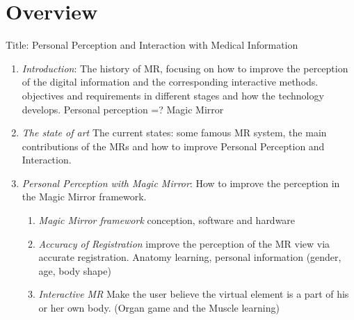 %
\section*{Overview}
\label{sec:methods}

Title: Personal Perception and Interaction with Medical Information

\begin{enumerate}
	\item
		\emph{Introduction}: The history of MR, focusing on how to improve the perception of the digital information and the corresponding interactive methods. objectives and requirements in different stages and how the technology develops.
		Personal perception =? Magic Mirror
	\item	
		\emph{The state of art} The current states: some famous MR system, the main contributions of the MRs and how to improve Personal Perception and Interaction. 
	
	\item
		\emph{Personal Perception with Magic Mirror}: How to improve the perception in the Magic Mirror framework.
		\begin{enumerate}
		\item	\emph{Magic Mirror framework} conception, software and hardware
		\item	\emph{Accuracy of Registration} improve the perception of the MR view via accurate registration. Anatomy learning, personal information (gender, age, body shape)
		\item	\emph{Interactive MR} Make the user believe the virtual element is a part of his or her own body. (Organ game and the Muscle learning)
		\end{enumerate}
	

\end{enumerate}

